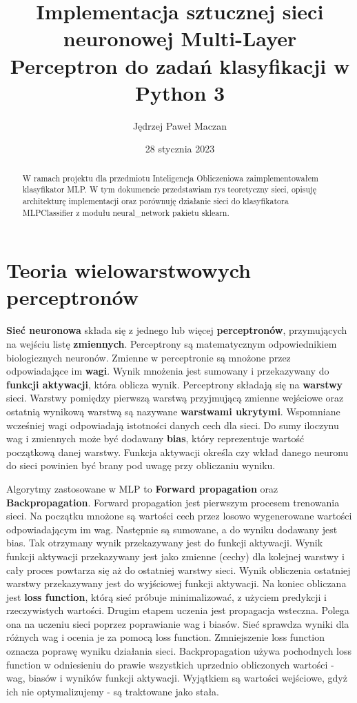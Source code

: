 \documentclass[12pt]{article}
\title{Implementacja sztucznej sieci neuronowej Multi-Layer Perceptron do zadań klasyfikacji w Python 3}
\author{Jędrzej Paweł Maczan}
\date{28 stycznia 2023}
\begin{document}
\markboth{\theauthor}{\thetitle}

\maketitle


\begin{abstract}
W ramach projektu dla przedmiotu Inteligencja Obliczeniowa zaimplementowałem klasyfikator MLP. W tym dokumencie przedstawiam rys teoretyczny sieci, opisuję architekturę implementacji oraz porównuję działanie sieci do klasyfikatora MLPClassifier z modułu neural\_network pakietu sklearn.
\end{abstract}


\section{Teoria wielowarstwowych perceptronów}

\textbf{Sieć neuronowa} składa się z jednego lub więcej \textbf{perceptronów}, przymujących na wejściu listę \textbf{zmiennych}. Perceptrony są matematycznym odpowiednikiem biologicznych neuronów. Zmienne w perceptronie są mnożone przez odpowiadające im \textbf{wagi}. Wynik mnożenia jest sumowany i przekazywany do \textbf{funkcji aktywacji}, która oblicza wynik. Perceptrony składają się na \textbf{warstwy} sieci. Warstwy pomiędzy pierwszą warstwą przyjmującą zmienne wejściowe oraz ostatnią wynikową warstwą są nazywane \textbf{warstwami ukrytymi}. Wspomniane wcześniej wagi odpowiadają istotności danych cech dla sieci. Do sumy iloczynu wag i zmiennych może być dodawany \textbf{bias}, który reprezentuje wartość początkową danej warstwy. Funkcja aktywacji określa czy wkład danego neuronu do sieci powinien być brany pod uwagę przy obliczaniu wyniku.

Algorytmy zastosowane w MLP to \textbf{Forward propagation} oraz \textbf{Backpropagation}. Forward propagation jest pierwszym procesem trenowania sieci. Na początku mnożone są wartości cech przez losowo wygenerowane wartości odpowiadającym im wag. Następnie są sumowane, a do wyniku dodawany jest bias. Tak otrzymany wynik przekazywany jest do funkcji aktywacji. Wynik funkcji aktywacji przekazywany jest jako zmienne (cechy) dla kolejnej warstwy i cały proces powtarza się aż do ostatniej warstwy sieci. Wynik obliczenia ostatniej warstwy przekazywany jest do wyjściowej funkcji aktywacji. Na koniec obliczana jest \textbf{loss function}, którą sieć próbuje minimalizować, z użyciem predykcji i rzeczywistych wartości. Drugim etapem uczenia jest propagacja wsteczna. Polega ona na uczeniu sieci poprzez poprawianie wag i biasów. Sieć sprawdza wyniki dla różnych wag i ocenia je za pomocą loss function. Zmniejszenie loss function oznacza poprawę wyniku działania sieci. Backpropagation używa pochodnych loss function w odniesieniu do prawie wszystkich uprzednio obliczonych wartości - wag, biasów i wyników funkcji aktywacji. Wyjątkiem są wartości wejściowe, gdyż ich nie optymalizujemy - są traktowane jako stała.
\end{document}
